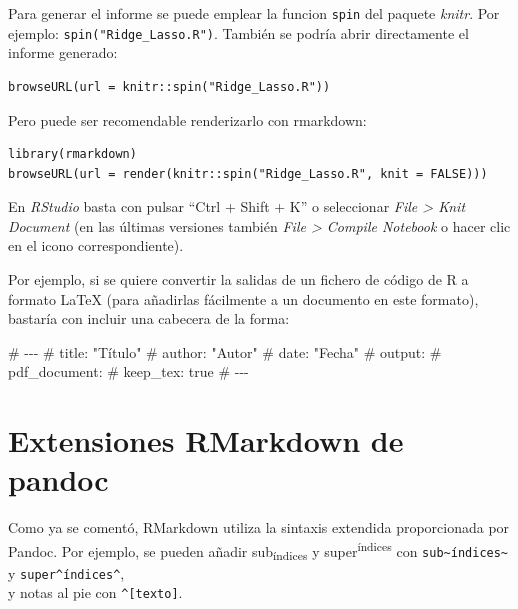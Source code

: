 \documentclass[
]{book}
\newenvironment{Shaded}{\begin{snugshade}}{\end{snugshade}}
\newcommand{\NormalTok}[1]{#1}
\theoremstyle{break}
\theoremstyle{nonumberplain}
\begin{document}
Para generar el informe se puede emplear la funcion \texttt{spin} del paquete \emph{knitr}. Por ejemplo: \texttt{spin("Ridge\_Lasso.R")}.
También se podría abrir directamente el informe generado:

\begin{verbatim}
browseURL(url = knitr::spin("Ridge_Lasso.R"))
\end{verbatim}

Pero puede ser recomendable renderizarlo con rmarkdown:

\begin{verbatim}
library(rmarkdown)
browseURL(url = render(knitr::spin("Ridge_Lasso.R", knit = FALSE)))
\end{verbatim}

En \emph{RStudio} basta con pulsar ``Ctrl + Shift + K'' o seleccionar \emph{File \textgreater{} Knit Document} (en las últimas versiones también \emph{File \textgreater{} Compile Notebook} o hacer clic en el icono correspondiente).

Por ejemplo, si se quiere convertir la salidas de un fichero de código de R a formato LaTeX
(para añadirlas fácilmente a un documento en este formato), bastaría con incluir una cabecera de
la forma:

\begin{Shaded}
\begin{Highlighting}[]
\NormalTok{\#\textquotesingle{} {-}{-}{-}}
\NormalTok{\#\textquotesingle{} title: "Título"}
\NormalTok{\#\textquotesingle{} author: "Autor"}
\NormalTok{\#\textquotesingle{} date: "Fecha"}
\NormalTok{\#\textquotesingle{} output:}
\NormalTok{\#\textquotesingle{}   pdf\_document:}
\NormalTok{\#\textquotesingle{}      keep\_tex: true}
\NormalTok{\#\textquotesingle{} {-}{-}{-}}
\end{Highlighting}
\end{Shaded}

\hypertarget{extensiones-rmarkdown-de-pandoc}{%
\section{Extensiones RMarkdown de pandoc}\label{extensiones-rmarkdown-de-pandoc}}

Como ya se comentó, RMarkdown utiliza la sintaxis extendida proporcionada por Pandoc.
Por ejemplo, se pueden añadir sub\textsubscript{índices} y super\textsuperscript{índices} con \texttt{sub\textasciitilde{}índices\textasciitilde{}} y \texttt{super\^{}índices\^{}},\\
y notas al pie con \texttt{\^{}{[}texto{]}}.
\end{document}
